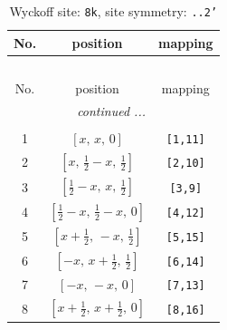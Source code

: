 \documentclass[fleqn,8pt]{jsarticle}
\begin{document}
\begin{longtable}{ccc}
\caption{Wyckoff site: {\tt 8k}, site symmetry: {\tt ..2'}}
 \\
 \hline \hline
No. & position & mapping \\ \hline \endfirsthead

\multicolumn{2}{l}{\tablename\ \thetable{}} \\
 \hline \hline
No. & position & mapping \\ \hline \endhead

 \hline \hline
\multicolumn{2}{r}{\footnotesize\it continued ...} \\ \endfoot

 \hline \hline
\multicolumn{2}{r}{} \\ \endlastfoot

1 & $\left[ x,\, x,\, 0 \right]$ & {\tt [1,11]} \\ \hline
2 & $\left[ x,\, \frac{1}{2} - x,\, \frac{1}{2} \right]$ & {\tt [2,10]} \\ \hline
3 & $\left[ \frac{1}{2} - x,\, x,\, \frac{1}{2} \right]$ & {\tt [3,9]} \\ \hline
4 & $\left[ \frac{1}{2} - x,\, \frac{1}{2} - x,\, 0 \right]$ & {\tt [4,12]} \\ \hline
5 & $\left[ x + \frac{1}{2},\, - x,\, \frac{1}{2} \right]$ & {\tt [5,15]} \\ \hline
6 & $\left[ - x,\, x + \frac{1}{2},\, \frac{1}{2} \right]$ & {\tt [6,14]} \\ \hline
7 & $\left[ - x,\, - x,\, 0 \right]$ & {\tt [7,13]} \\ \hline
8 & $\left[ x + \frac{1}{2},\, x + \frac{1}{2},\, 0 \right]$ & {\tt [8,16]} \\
\end{longtable}
\renewcommand{\arraystretch}{1.2}
\end{document}
